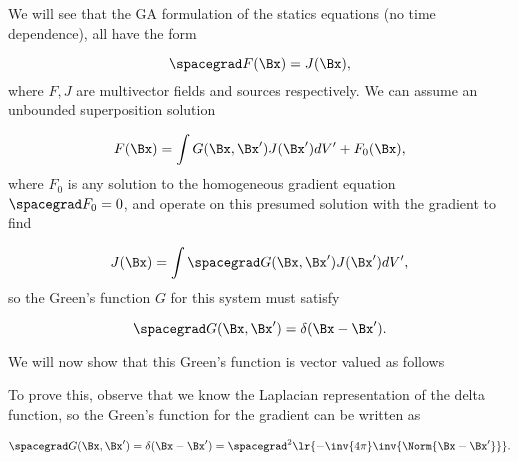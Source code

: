 %
%


We will see that the GA formulation of the statics equations (no time dependence), all have the form

\begin{dmath}\label{eqn:greensFunctionGradient:420}
\spacegrad F(\Bx) = J(\Bx),
\end{dmath}
where \( F, J \) are multivector fields and sources respectively.  We can assume an unbounded superposition solution

\begin{dmath}\label{eqn:greensFunctionGradient:440}
F(\Bx) = \int G(\Bx, \Bx') J(\Bx') dV' + F_0(\Bx),
\end{dmath}
where \( F_0 \) is any solution to the homogeneous gradient equation \( \spacegrad F_0 = 0 \), and operate on this presumed solution with the gradient to find

\begin{dmath}\label{eqn:greensFunctionGradient:460}
J(\Bx)
= \int \spacegrad G(\Bx, \Bx') J(\Bx') dV',
\end{dmath}
so the Green's function \( G \) for this system must satisfy

\begin{dmath}\label{eqn:greensFunctionGradient:480}
\spacegrad G(\Bx, \Bx') = \delta( \Bx - \Bx' ).
\end{dmath}

We will now show that this Green's function is vector valued as follows


To prove this, observe that we know the Laplacian representation of the delta function, so
the Green's function for the gradient can be written as

\begin{equation}\label{eqn:greensFunctionGradient:481}
\spacegrad G(\Bx, \Bx') = \delta( \Bx - \Bx' ) = \spacegrad^2 \lr{ -\inv{4\pi} \inv{ \Norm{\Bx - \Bx'} } }.
\end{equation}

